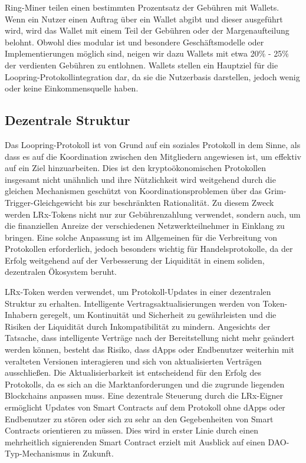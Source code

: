 \documentclass[UTF8,nofonts]{article}
\begin{document}
\begin{multicols}{2}
Ring-Miner teilen einen bestimmten Prozentsatz der Gebühren mit Wallets. Wenn ein Nutzer einen Auftrag über ein Wallet abgibt und dieser ausgeführt wird, wird das Wallet mit einem Teil der Gebühren oder der Margenaufteilung belohnt. Obwohl dies modular ist und besondere Geschäftsmodelle oder Implementierungen möglich sind, neigen wir dazu Wallets mit etwa 20\% - 25\% der verdienten Gebühren zu entlohnen. Wallets stellen ein Hauptziel für die Loopring-Protokollintegration dar, da sie die Nutzerbasis darstellen, jedoch wenig oder keine Einkommensquelle haben.

\subsection{Dezentrale Struktur}
Das Loopring-Protokoll ist von Grund auf ein soziales Protokoll in dem Sinne, als dass es auf die Koordination zwischen den Mitgliedern angewiesen ist, um effektiv auf ein Ziel hinzuarbeiten. Dies ist den kryptoökonomischen Protokollen insgesamt nicht unähnlich und ihre Nützlichkeit wird weitgehend durch die gleichen Mechanismen geschützt von Koordinationsproblemen \cite{vitalikgovernance} über das Grim-Trigger-Gleichgewicht bis zur beschränkten Rationalität. Zu diesem Zweck werden LRx-Tokens nicht nur zur Gebührenzahlung verwendet, sondern auch, um die finanziellen Anreize der verschiedenen Netzwerkteilnehmer in Einklang zu bringen. Eine solche Anpassung ist im Allgemeinen für die Verbreitung von Protokollen erforderlich, jedoch besonders wichtig für Handelsprotokolle, da der Erfolg weitgehend auf der Verbesserung der Liquidität in einem soliden, dezentralen Ökosystem beruht.

LRx-Token werden verwendet, um Protokoll-Updates in einer dezentralen Struktur zu erhalten. Intelligente Vertragsaktualisierungen werden von Token-Inhabern geregelt, um Kontinuität und Sicherheit zu gewährleisten und die Risiken der Liquidität durch Inkompatibilität zu mindern. Angesichts der Tatsache, dass intelligente Verträge nach der Bereitstellung nicht mehr geändert werden können, besteht das Risiko, dass dApps oder Endbenutzer weiterhin mit veralteten Versionen interagieren und sich von aktualisierten Verträgen ausschließen. Die Aktualisierbarkeit ist entscheidend für den Erfolg des Protokolls, da es sich an die Marktanforderungen und die zugrunde liegenden Blockchains anpassen muss. Eine dezentrale Steuerung durch die LRx-Eigner ermöglicht Updates von Smart Contracts auf dem Protokoll ohne dApps oder Endbenutzer zu stören oder sich zu sehr an den Gegebenheiten von Smart Contracts orientieren zu müssen. Dies wird in erster Linie durch einen mehrheitlich signierenden Smart Contract erzielt mit Ausblick auf einen DAO-Typ-Mechanismus in Zukunft.


\end{multicols}
\end{document}
